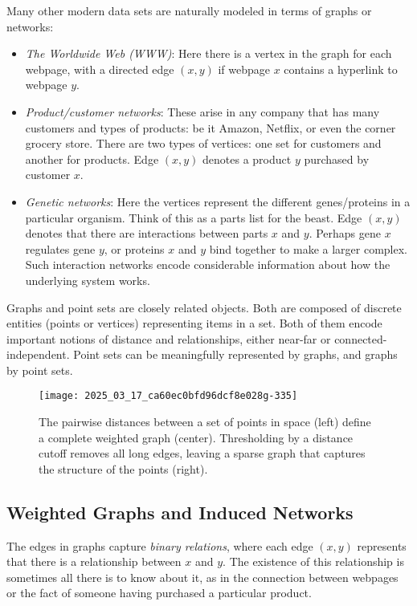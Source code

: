 \documentclass[10pt]{article}
\begin{document}
Many other modern data sets are naturally modeled in terms of graphs or networks:

\begin{itemize}
    \item \textit{The Worldwide Web (WWW)}: Here there is a vertex in the graph for each webpage, with a directed edge $(x, y)$ if webpage $x$ contains a hyperlink to webpage $y$.
    \item \textit{Product/customer networks}: These arise in any company that has many customers and types of products: be it Amazon, Netflix, or even the corner grocery store. There are two types of vertices: one set for customers and another for products. Edge $(x, y)$ denotes a product $y$ purchased by customer $x$.
    \item \textit{Genetic networks}: Here the vertices represent the different genes/proteins in a particular organism. Think of this as a parts list for the beast. Edge $(x, y)$ denotes that there are interactions between parts $x$ and $y$. Perhaps gene $x$ regulates gene $y$, or proteins $x$ and $y$ bind together to make a larger complex. Such interaction networks encode considerable information about how the underlying system works.
\end{itemize}

Graphs and point sets are closely related objects. Both are composed of discrete entities (points or vertices) representing items in a set. Both of them encode important notions of distance and relationships, either near-far or connected-independent. Point sets can be meaningfully represented by graphs, and graphs by point sets.

\begin{figure}[htbp]
    \centering
    \texttt{[image: 2025\_03\_17\_ca60ec0bfd96dcf8e028g-335]}
    \caption{The pairwise distances between a set of points in space (left) define a complete weighted graph (center). Thresholding by a distance cutoff removes all long edges, leaving a sparse graph that captures the structure of the points (right).}
\end{figure}

\subsection{Weighted Graphs and Induced Networks}
The edges in graphs capture \textit{binary relations}, where each edge $(x, y)$ represents that there is a relationship between $x$ and $y$. The existence of this relationship is sometimes all there is to know about it, as in the connection between webpages or the fact of someone having purchased a particular product.
\end{document}
